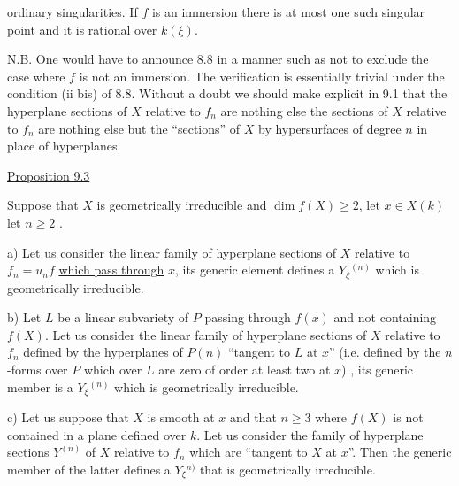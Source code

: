 
ordinary singularities.  If $f$ is an immersion there is at most one
such singular point and it is rational over $k(\xi)$.

N.B. One would have to announce 8.8 in a manner such as not
to exclude the case where $f$ is not an immersion.  The verification
is essentially trivial under the condition (ii bis) of 8.8.
Without a doubt we should make explicit in 9.1 that the hyperplane
sections of $X$ relative to $f_n$ are nothing else the sections of $X$
relative to $f_n$ are nothing else but the ``sections'' of $X$ by
hypersurfaces of degree $n$ in place of hyperplanes.

\uline{Proposition 9.3}

Suppose that $X$ is geometrically irreducible and $\dim f(X) \geq 2$,
let $x \in X(k)$ let $n \geq 2$ .

a) Let us consider the linear family of hyperplane sections
of $X$ relative to $f_n =u_nf$ \uline{which pass through} $x$, its generic element
defines a $Y_\xi{}^{(n)}$ which is geometrically irreducible.

b) Let $L$ be a linear subvariety of $P$ passing through $f(x)$ and
not containing $f(X)$.  Let us consider the linear family of
hyperplane sections of $X$ relative to $f_n$ defined by the hyperplanes
of $P(n)$ ``tangent to $L$ at $x$'' (i.e. defined by the $n$-forms over $P$
which over $L$ are zero of order at least two at $x$) , its generic
member is a $Y_\xi{}^{(n)}$ which is geometrically irreducible.

c) Let us suppose that $X$ is smooth at $x$ and that $n \geq 3$ where
$f(X)$ is not contained in a plane defined over $k$.  Let us consider
the family of hyperplane sections $Y^{(n)}$ of $X$ relative to $f_n$ which
are ``tangent to $X$ at $x$''.  Then the generic member of the latter
defines a $Y_\xi{}^{n)}$ that is geometrically irreducible.

